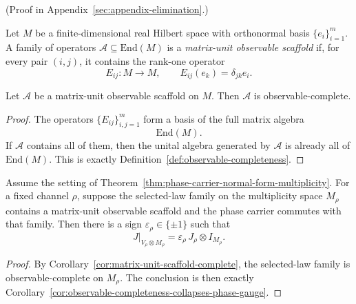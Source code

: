 (Proof in Appendix~\ref{sec:appendix-elimination}.)

\begin{definition}
\label{def:matrix-unit-observable-scaffold}
Let $M$ be a finite-dimensional real Hilbert space with orthonormal basis
$\{e_i\}_{i=1}^m$. A family of operators $\mathcal A\subseteq\mathrm{End}(M)$
is a \emph{matrix-unit observable scaffold} if, for every pair $(i,j)$, it
contains the rank-one operator
\[
E_{ij}:M\to M,
\qquad
E_{ij}(e_k)=\delta_{jk}e_i.
\]
\end{definition}

\begin{corollary}
\label{cor:matrix-unit-scaffold-complete}
Let $\mathcal A$ be a matrix-unit observable scaffold on $M$. Then
$\mathcal A$ is observable-complete.
\end{corollary}

\begin{proof}
The operators $\{E_{ij}\}_{i,j=1}^m$ form a basis of the full matrix algebra
\[
\mathrm{End}(M).
\]
If $\mathcal A$ contains all of them, then the unital algebra generated by
$\mathcal A$ is already all of $\mathrm{End}(M)$. This is exactly
Definition~\ref{def:observable-completeness}.
\end{proof}

\begin{corollary}
\label{cor:matrix-unit-scaffold-phase}
Assume the setting of
Theorem~\ref{thm:phase-carrier-normal-form-multiplicity}. For a fixed channel
$\rho$, suppose the selected-law family on the multiplicity space $M_{\rho}$
contains a matrix-unit observable scaffold and the phase carrier commutes with
that family. Then there is a sign $\varepsilon_{\rho}\in\{\pm1\}$ such that
\[
J|_{V_{\rho}\otimes M_{\rho}}
=
\varepsilon_{\rho}\,J_{\rho}\otimes I_{M_{\rho}}.
\]
\end{corollary}

\begin{proof}
By Corollary~\ref{cor:matrix-unit-scaffold-complete}, the selected-law family
is observable-complete on $M_{\rho}$. The conclusion is then exactly
Corollary~\ref{cor:observable-completeness-collapses-phase-gauge}.
\end{proof}

